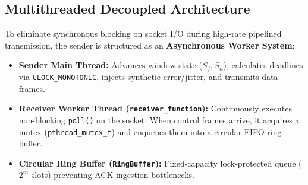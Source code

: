 \documentclass[11pt,a4paper]{article}
\begin{document}
\subsection{Multithreaded Decoupled Architecture}
To eliminate synchronous blocking on socket I/O during high-rate pipelined transmission, the sender is structured as an \textbf{Asynchronous Worker System}:
\begin{itemize}[leftmargin=1.2em]
    \item \textbf{Sender Main Thread:} Advances window state ($S_f, S_n$), calculates deadlines via \texttt{CLOCK\_MONOTONIC}, injects synthetic error/jitter, and transmits data frames.
    \item \textbf{Receiver Worker Thread (\texttt{receiver\_function}):} Continuously executes non-blocking \texttt{poll()} on the socket. When control frames arrive, it acquires a mutex (\texttt{pthread\_mutex\_t}) and enqueues them into a circular FIFO ring buffer.
    \item \textbf{Circular Ring Buffer (\texttt{RingBuffer}):} Fixed-capacity lock-protected queue ($2^m$ slots) preventing ACK ingestion bottlenecks.
\end{itemize}
\end{document}

